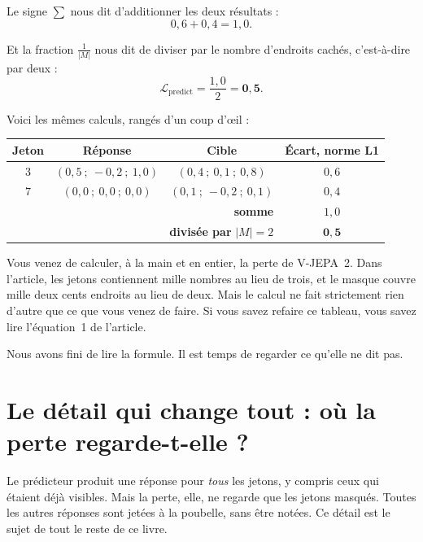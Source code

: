 Le signe $\sum$ nous dit d'additionner les deux résultats :
\[
  0{,}6 + 0{,}4 = 1{,}0 .
\]

Et la fraction $\frac{1}{|M|}$ nous dit de diviser par le nombre d'endroits
cachés, c'est-à-dire par deux :
\[
  \mathcal{L}_{\text{predict}} = \frac{1{,}0}{2} = \bm{0{,}5} .
\]

\begin{exemple}
Voici les mêmes calculs, rangés d'un coup d'œil :

\begin{center}
\footnotesize
\begin{tabular}{cccc}
\toprule
\textbf{Jeton} & \textbf{Réponse} & \textbf{Cible} & \textbf{Écart, norme L1} \\
\midrule
$3$ & $(0{,}5 \ ; \ -0{,}2 \ ; \ 1{,}0)$ & $(0{,}4 \ ; \ 0{,}1 \ ; \ 0{,}8)$ & $0{,}6$ \\
$7$ & $(0{,}0 \ ; \ 0{,}0 \ ; \ 0{,}0)$ & $(0{,}1 \ ; \ -0{,}2 \ ; \ 0{,}1)$ & $0{,}4$ \\
\midrule
\multicolumn{3}{r}{\textbf{somme}} & $1{,}0$ \\
\multicolumn{3}{r}{\textbf{divisée par } $|M| = 2$} & $\bm{0{,}5}$ \\
\bottomrule
\end{tabular}
\end{center}
\end{exemple}

\begin{aretenir}
Vous venez de calculer, à la main et en entier, la perte de V-JEPA~2. Dans
l'article, les jetons contiennent mille nombres au lieu de trois, et le
masque couvre mille deux cents endroits au lieu de deux. Mais le calcul ne
fait strictement rien d'autre que ce que vous venez de faire. Si vous savez
refaire ce tableau, vous savez lire l'équation~1 de l'article.
\end{aretenir}

Nous avons fini de lire la formule. Il est temps de regarder ce qu'elle ne
dit pas.

\section{Le détail qui change tout : où la perte regarde-t-elle ?}

\begin{enclair}
Le prédicteur produit une réponse pour \emph{tous} les jetons, y compris
ceux qui étaient déjà visibles. Mais la perte, elle, ne regarde que les
jetons masqués. Toutes les autres réponses sont jetées à la poubelle, sans
être notées. Ce détail est le sujet de tout le reste de ce livre.
\end{enclair}

